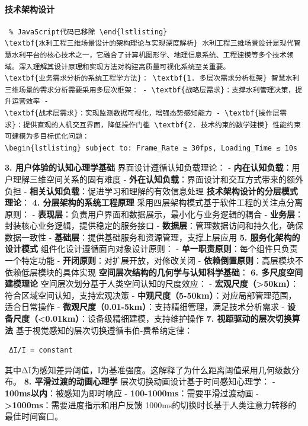 \paragraph{技术架构设计}\label{ux6280ux672fux67b6ux6784ux8bbeux8ba1} \begin{lstlisting} % JavaScript代码已移除 \end{lstlisting}
\textbf{水利工程三维场景设计的架构理论与实现深度解析} 水利工程三维场景设计是现代智慧水利平台的核心技术之一，它融合了计算机图形学、地理信息系统、工程建模等多个技术领域。深入理解其设计原理和实现方法对构建高质量可视化系统至关重要。
\textbf{业务需求分析的系统工程学方法}： \textbf{1. 多层次需求分析框架} 智慧水利三维场景的需求分析需要采用多层次框架： - \textbf{战略层需求}：支撑水利管理决策，提升运营效率 -
\textbf{战术层需求}：实现监测数据可视化，增强态势感知能力 - \textbf{操作层需求}：提供直观的人机交互界面，降低操作门槛 \textbf{2. 技术约束的数学建模} 性能约束可建模为多目标优化问题：
\begin{lstlisting} subject to: Frame_Rate ≥ 30fps, Loading_Time ≤ 10s \end{lstlisting} \textbf{3. 用户体验的认知心理学基础}
界面设计遵循认知负载理论： - \textbf{内在认知负载}：用户理解三维空间关系的固有难度 - \textbf{外在认知负载}：界面设计和交互方式带来的额外负担 - \textbf{相关认知负载}：促进学习和理解的有效信息处理
\textbf{技术架构设计的分层模式理论}： \textbf{4. 分层架构的系统工程原理} 采用四层架构模式基于软件工程的关注点分离原则： - \textbf{表现层}：负责用户界面和数据展示，最小化与业务逻辑的耦合 -
\textbf{业务层}：封装核心业务逻辑，提供稳定的服务接口 - \textbf{数据层}：管理数据访问和持久化，确保数据一致性 - \textbf{基础层}：提供基础服务和资源管理，支撑上层应用 \textbf{5.
服务化架构的设计模式} 组件化设计遵循面向对象设计原则： - \textbf{单一职责原则}：每个组件只负责一个特定功能 - \textbf{开闭原则}：对扩展开放，对修改关闭 -
\textbf{依赖倒置原则}：高层模块不依赖低层模块的具体实现 \textbf{空间层次结构的几何学与认知科学基础}： \textbf{6. 多尺度空间建模理论} 空间层次划分基于人类空间认知的尺度效应： -
\textbf{宏观尺度（>50km）}：符合区域空间认知，支持宏观决策 - \textbf{中观尺度（5-50km）}：对应局部管理范围，适合日常操作 - \textbf{微观尺度（0.01-5km）}：支持精细管理，满足技术分析需求 -
\textbf{设备尺度（<0.01km）}：设备级精细建模，支持维护操作 \textbf{7. 视距驱动的层次切换算法} 基于视觉感知的层次切换遵循韦伯-费希纳定律： \begin{lstlisting} ΔI/I = constant
\end{lstlisting} 其中ΔI为感知差异阈值，I为基准强度。这解释了为什么距离阈值采用几何级数分布。 \textbf{8. 平滑过渡的动画心理学} 层次切换动画设计基于时间感知心理学： -
\textbf{100ms以内}：被感知为即时响应 - \textbf{100-1000ms}：需要平滑过渡动画 - \textbf{>1000ms}：需要进度指示和用户反馈 1000ms的切换时长基于人类注意力转移的最佳时间窗口。
